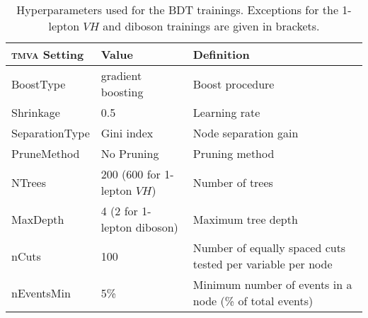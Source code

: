 \begin{table}[htbp]
  \begin{center}
    \begin{tabular}{lll}
      \toprule
      \textsc{tmva} Setting & Value & Definition \\
      \midrule
      BoostType & gradient boosting & Boost procedure \\
      Shrinkage & 0.5 & Learning rate \\
      SeparationType & Gini index & Node separation gain \\
      PruneMethod & No Pruning & Pruning method \\
      NTrees & 200 (600 for 1-lepton $VH$) & Number of trees \\
      MaxDepth & 4 (2 for 1-lepton diboson) & Maximum tree depth \\
      nCuts & 100 & Number of equally spaced cuts tested per variable per node \\
      nEventsMin & 5\% & Minimum number of events in a node (\% of total events) \\
      \bottomrule
    \end{tabular}
    \caption{Hyperparameters used for the BDT trainings. Exceptions for the 1-lepton $VH$ and diboson trainings are given in brackets.}
    \label{tbl:BDTSetup}
  \end{center}
\end{table}